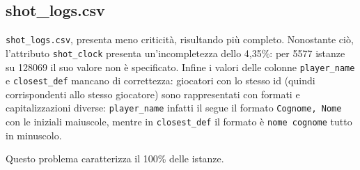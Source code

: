 \subsection{shot\_logs.csv}

\texttt{shot\_logs.csv}, presenta meno criticità, risultando più completo. Nonostante ciò, l’attributo \texttt{shot\_clock} presenta un’incompletezza dello 4,35\%: per 5577 istanze su 128069 il suo valore non è specificato.
Infine i valori delle colonne \texttt{player\_name} e \texttt{closest\_def} mancano di correttezza: giocatori con lo stesso id (quindi corrispondenti allo stesso giocatore) sono rappresentati con formati e capitalizzazioni diverse: \texttt{player\_name} infatti il segue il formato \texttt{Cognome, Nome} con le iniziali maiuscole, mentre in \texttt{closest\_def} il formato è \texttt{nome cognome} tutto in minuscolo.
\par
Questo problema caratterizza il 100\% delle istanze.
